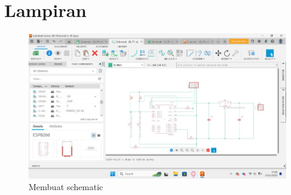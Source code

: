 \section*{Lampiran} %
\begin{figure}[H]
  \centering
  \includegraphics[width=0.7\linewidth]{img/modul_1/schematic.jpg}
  \caption{Membuat schematic} 
  \label{fig:inirujukan}
\end{figure}
\vspace{0pt}
